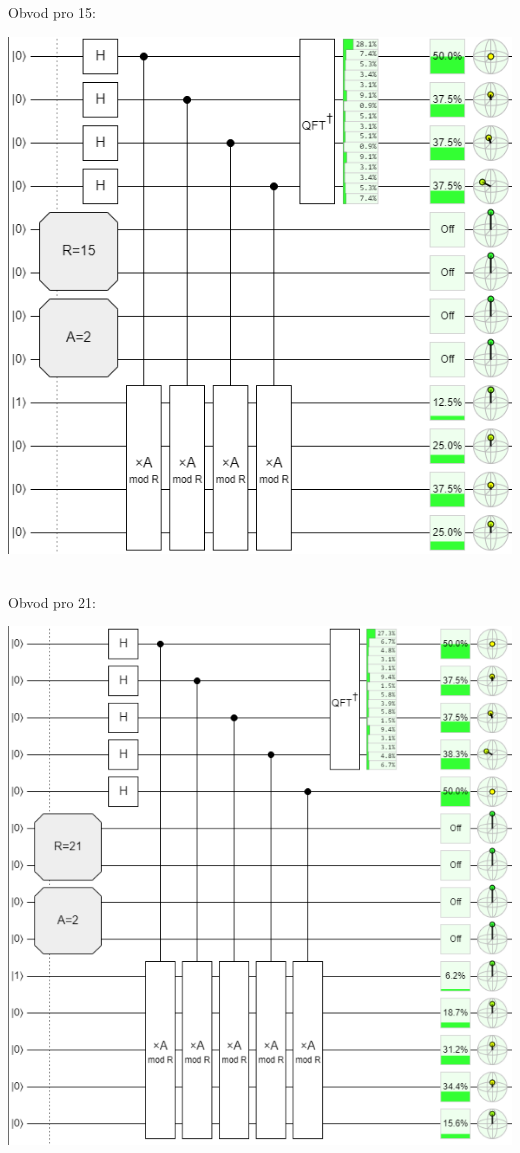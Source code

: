 \documentclass[12pt, a4paper]{article}
\begin{document}
Obvod pro 15:
\begin{center}
\includegraphics{4/15.png}
\end{center}\\
Obvod pro 21:
\begin{center}
\includegraphics{4/21.png}
\end{center}
\end{document}
